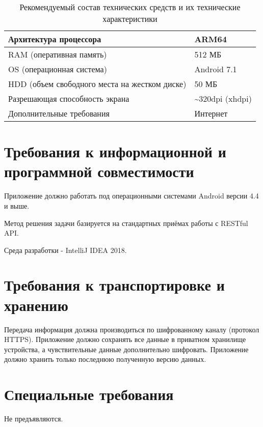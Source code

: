 \begin{table}[ht]
  \centering
  \caption{Рекомендуемый состав технических средств и их технические характеристики}
  \label{tab:rqmtsRecommended}
  \begin{tabular}{|l|l|}
    \hline Архитектура процессора & ARM64 \\ \hline
    RAM (оперативная память) & 512 МБ \\ \hline
    OS (операционная система) & Android 7.1 \\ \hline
    HDD (объем свободного места на жестком диске) & 50 МБ \\ \hline
    Разрешающая способность экрана & \textasciitilde 320dpi (xhdpi) \\ \hline
    Дополнительные требования & Интернет \\ \hline
  \end{tabular}
\end{table}

\section{Требования к информационной и программной совместимости}
\label{sec:infoRqmts}
Приложение должно работать под операционными системами Android версии 4.4 и выше.

Метод решения задачи базируется на стандартных приёмах работы с RESTful API\@.

Среда разработки - IntelliJ IDEA 2018.

\section{Требования к транспортировке и хранению}
\label{sec:storageRqmts}
Передача информация должна производиться по шифрованному каналу (протокол HTTPS).
Приложение должно сохранять все данные в приватном хранилище устройства, а чувствительные данные дополнительно шифровать.
Приложение должно хранить только последнюю полученную версию данных.

\section{Специальные требования}
\label{sec:specialRqmts}
Не предъявляются.
